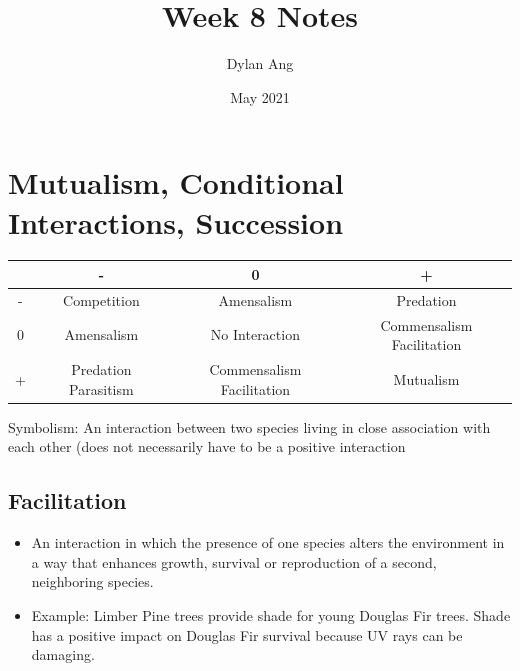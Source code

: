 \documentclass[12pt]{article}
\title{Week 8 Notes}
\author{Dylan Ang}
\date{May 2021}
\begin{document}
\maketitle

\tableofcontents

\section{Mutualism, Conditional Interactions, Succession}

\begin{table}[h]
    \centering
    \begin{tabular}{c |c | c | c|}
          & -                    & 0                         & +                         \\ \hline
        - & Competition          & Amensalism                & Predation                 \\\hline
        0 & Amensalism           & No Interaction            & Commensalism Facilitation \\\hline
        + & Predation Parasitism & Commensalism Facilitation & Mutualism                 \\\hline
    \end{tabular}
\end{table}

Symbolism: An interaction between two species living in close association with each other (does not necessarily have to be a positive interaction

\subsection{Facilitation}
\begin{itemize}
    \item An interaction in which the presence of one species alters the environment in a way that enhances growth, survival or reproduction of a second, neighboring species.
    \item Example: Limber Pine trees provide shade for young Douglas Fir trees. Shade has a positive impact on Douglas Fir survival because UV rays can be damaging.
\end{itemize}
\end{document}
